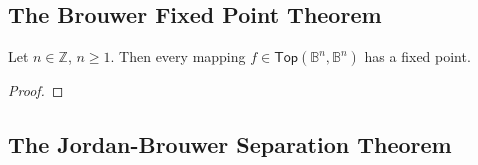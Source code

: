 \subsection*{The Brouwer Fixed Point Theorem}
\begin{theorem}
	Let $n \in \mathbb{Z}$, $n \geq 1$. Then every mapping $f \in \mathsf{Top}(\mathbb{B}^n,\mathbb{B}^n)$ has a fixed point.	
	\label{thm:brouwer_fixed_point}
\end{theorem}

\begin{proof}
	
\end{proof}

\subsection*{The Jordan-Brouwer Separation Theorem}
